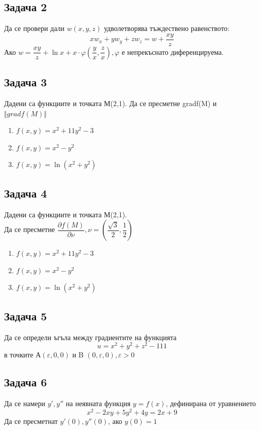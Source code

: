 \documentclass[a4paper,fleqn,12pt]{article}
\theoremstyle{definition}
\begin{document}
\subsection*{Задача 2}
Да се провери дали $w(x,y,z)$ удволетворява тъждествено равенството:
$$x w_x + y w_y+z w_z = w + \dfrac{xy}{z}$$
Ако $w = \dfrac{xy}{z} + \ln{x} + x \cdot \varphi \left(\dfrac{y}{x}, \dfrac{z}{x}\right), \varphi$ е непрекъснато диференцируема.

\subsection*{Задача 3}
Дадени са функциите и точката М(2,1). Да се пресметне gradf(M) и $\Vert grad f(M)\Vert$
\begin{enumerate}
\item $ f(x,y) = x^2 + 11y^2 - 3$
\item $ f(x,y) = x^2 - y^2$
\item $ f(x,y) = \ln{(x^2 + y^2)}$
\end{enumerate}

\subsection*{Задача 4}
Дадени са функциите и точката М(2,1). \\
Да се пресметне $\dfrac{\partial f(M)}{\partial \nu}, \nu = \left( \dfrac{\sqrt{3}}{2} , \dfrac{1}{2}\right)$ 
\begin{enumerate}
\item $ f(x,y) = x^2 + 11y^2 - 3$
\item $ f(x,y) = x^2 - y^2$
\item $ f(x,y) = \ln{(x^2 + y^2)}$
\end{enumerate}

\subsection*{Задача 5}
Да се определи ъгъла между градиентите на функцията 
$$u = x^2 + y^2 + z^2 - 111$$
в точките А$(\varepsilon,0,0)$ и B $(0,\varepsilon,0), \varepsilon >0$

\subsection*{Задача 6}
Да се намери $y', y''$ на неявната функция $y = f(x)$, дефинирана от уравнението 
$$x^2 - 2xy + 5y^2 + 4y = 2x + 9$$
Да се пресметнат $y'(0), y''(0)$, ако $y(0) = 1$ 
\end{document}
